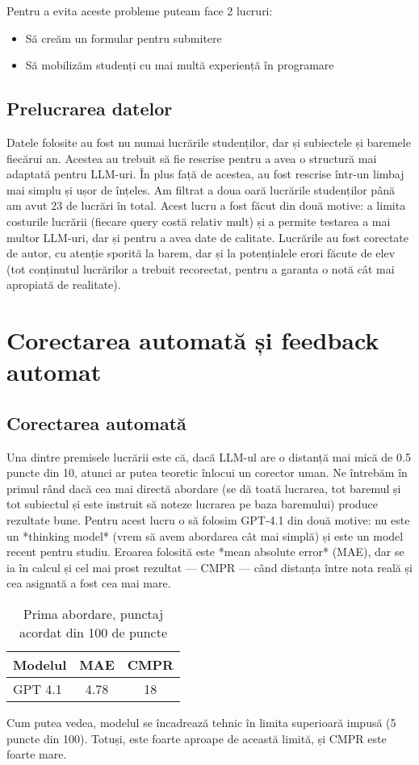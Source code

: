 \documentclass[12pt, a4paper]{report}
\begin{document}
Pentru a evita aceste probleme puteam face 2 lucruri:
\begin{itemize}
  \item Să creăm un formular pentru submitere
  \item Să mobilizăm studenți cu mai multă experiență în programare
\end{itemize}


\section{Prelucrarea datelor}
Datele folosite au fost nu numai lucrările studenților, dar și subiectele și baremele fiecărui an. Acestea au trebuit să fie rescrise pentru a avea o structură mai adaptată pentru LLM-uri.  
În plus față de acestea, au fost rescrise într-un limbaj mai simplu și ușor de înțeles. Am filtrat a doua oară lucrările studenților până am avut 23 de lucrări în total. Acest lucru a fost făcut din două motive: a limita costurile lucrării (fiecare query costă relativ mult) și a permite testarea a mai multor LLM-uri, dar și pentru a avea date de calitate.  
Lucrările au fost corectate de autor, cu atenție sporită la barem, dar și la potențialele erori făcute de elev (tot conținutul lucrărilor a trebuit recorectat, pentru a garanta o notă cât mai apropiată de realitate).

\chapter{Corectarea automată și feedback automat}
\section{Corectarea automată}

Una dintre premisele lucrării este că, dacă LLM-ul are o distanță mai mică de 0.5 puncte din 10, atunci ar putea teoretic înlocui un corector uman.  
Ne întrebăm în primul rând dacă cea mai directă abordare (se dă toată lucrarea, tot baremul și tot subiectul și este instruit să noteze lucrarea pe baza baremului) produce rezultate bune.  
Pentru acest lucru o să folosim GPT-4.1 din două motive: nu este un *thinking model* (vrem să avem abordarea cât mai simplă) și este un model recent pentru studiu.  
Eroarea folosită este *mean absolute error* (MAE), dar se ia în calcul și cel mai prost rezultat — CMPR — când distanța între nota reală și cea asignată a fost cea mai mare.

\begin{table}[h!]
\centering
\begin{tabular}{|l|c|c|}
\hline
\textbf{Modelul} & \textbf{MAE} & \textbf{CMPR} \\
\hline
GPT 4.1 & 4.78 & 18\\
\hline
\end{tabular}
\caption{Prima abordare, punctaj acordat din 100 de puncte}

\end{table}
Cum putea vedea, modelul se încadrează tehnic în limita superioară impusă (5 puncte din 100). Totuși, este foarte aproape de această limită, și CMPR este foarte mare.
\end{document}
